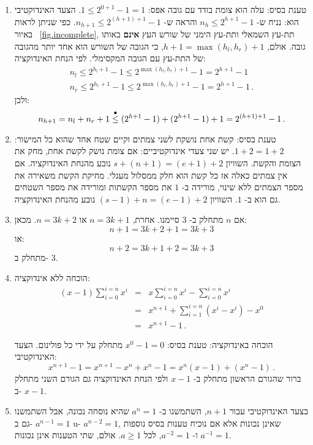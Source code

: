 \begin{enumerate}
\item 
טענת בסיס: עלה הוא צומת בודד עם גובה אפס: 
$1\leq 2^{0+1}-1=1$.
הצעד האינדוקטיבי הוא: נניח ש-%
$n_h\leq 2^{h+1}-1$
והראה ש-%
$n_{h+1}\leq 2^{(h+1)+1}-1$.
כפי שניתן לראות באיור~%
\ref{fig.incomplete},
תת-עץ השמאלי ותת-עץ הימני של שורש העץ
\textbf{אינם}
באותו גובה. אולם, 
$h+1=\max(h_l,h_r)+1$,
כי הגובה של השורש הוא אחד יותר מהגובה של התת-עץ עם הגובה המקסימלי. לפי הנחת האינדוקציה:
\[
\begin{array}{l}
n_l\leq 2^{h_l+1}-1\leq 2^{\max(h_l,h_r)+1}-1 = 2^{h+1}-1\\
n_r\leq 2^{h_r+1}-1\leq 2^{\max(h_l,h_r)+1}-1 = 2^{h+1}-1\,.
\end{array}
\]
ולכן:
\[
n_{h+1} = n_l + n_r + 1 \stackrel{\bullet}{\leq}{} (2^{h+1}-1) + (2^{h+1}-1) + 1 = 2^{(h+1)+1} - 1\,.
\]

\item 
טענת בסיס: קשת אחת נושקת לשני צמתים וקיים שטח אחד שהוא כל המישור:
$1+2=1+2$.
יש שני צעדי אינדוקטיביים: אם צומת נושק לקשת אחת, מחק את הצומת והקשת. השוויון 
$s+(n+1)=(e+1)+2$
נובע מהנחת האינדוקציה. אם אין צמתים כאלה אז כל קשת הוא חלק ממסלול מעגלי. מחיקת הקשת משאירה את מספר הצמתים ללא שינוי, מורידה ב-%
$1$
את מספר הקשתות ומורידה את מספר השטחים גם הוא ב-%
$1$.
השוויון
$(s-1)+n=(e-1)+2$
נובע מהנחת האינדוקציה.


\item 
אם 
$n$
מתחלק ב-%
$3$
סיימנו. אחרת,
$n=3k+1$
או
$n=3k+2$.
מכאן:
\[
n+1=3k+2+1=3k+3
\]
או:
\[
n+2=3k+1+2=3k+3
\]
מתחלק ב-%
$3$.

\item
הוכחה ללא אינדוקציה:
\begin{eqnarray*}
(x-1)\sum_{i=0}^{i=n}x^i &=& x\sum_{i=0}^{i=n}x^i - \sum_{i=0}^{i=n}x^i\\
&=&x^{n+1} + \sum_{i=1}^{i=n}(x^i-x^i) -x^0\\
&=&x^{n+1} - 1\,.
\end{eqnarray*}

הוכחה באינדוקציה: טענת בסיס:
$x^0-1=0$
מתחלק על ידי כל פולינום. הצעד האינדוקטיבי:
\[
x^{n+1} - 1 = x^{n+1} -x^n + x^n - 1= x^n(x-1) + (x^n-1)\,.
\]
ברור שהגורם הראשון מתחלק ב-%
$x-1$
ולפי הנחת האינדוקציה גם הגורם השני מתחלק ב-%
$x-1$.

\item
בצעד האינדוקטיבי עבור
$n+1$,
השתמשנו ב-%
$a^{n}=1$
שהיא נוסחה נכונה, אבל השתמשנו גם ב-%
$a^{n-1}=1$
u-%
$a^{n-2}=1$,
שאינן נכונות אלא אם נוכיח טענות בסיס נוספות
$a^{-1}=1$
ו-%
$a^{-2}=1$,
לכל
$a\geq 1$.
אולם, שתי הטענות אינן נכונות.


\end{enumerate}
